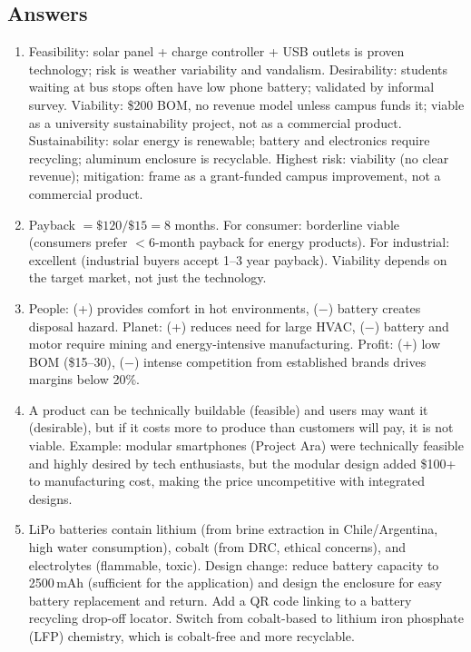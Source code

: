 \documentclass[11pt,letterpaper,twoside,openany]{book}
\begin{document}
\subsection{Answers}
\begin{enumerate}[leftmargin=1.5em]
\item Feasibility: solar panel + charge controller + USB outlets is proven technology; risk is weather variability and vandalism. Desirability: students waiting at bus stops often have low phone battery; validated by informal survey. Viability: \$200 BOM, no revenue model unless campus funds it; viable as a university sustainability project, not as a commercial product. Sustainability: solar energy is renewable; battery and electronics require recycling; aluminum enclosure is recyclable. Highest risk: viability (no clear revenue); mitigation: frame as a grant-funded campus improvement, not a commercial product.
\item Payback $= \$120/\$15 = 8$ months. For consumer: borderline viable (consumers prefer $<$6-month payback for energy products). For industrial: excellent (industrial buyers accept 1--3 year payback). Viability depends on the target market, not just the technology.
\item People: (+) provides comfort in hot environments, ($-$) battery creates disposal hazard. Planet: (+) reduces need for large HVAC, ($-$) battery and motor require mining and energy-intensive manufacturing. Profit: (+) low BOM (\$15--30), ($-$) intense competition from established brands drives margins below 20\%.
\item A product can be technically buildable (feasible) and users may want it (desirable), but if it costs more to produce than customers will pay, it is not viable. Example: modular smartphones (Project Ara) were technically feasible and highly desired by tech enthusiasts, but the modular design added \$100+ to manufacturing cost, making the price uncompetitive with integrated designs.
\item LiPo batteries contain lithium (from brine extraction in Chile/Argentina, high water consumption), cobalt (from DRC, ethical concerns), and electrolytes (flammable, toxic). Design change: reduce battery capacity to 2500\,mAh (sufficient for the application) and design the enclosure for easy battery replacement and return. Add a QR code linking to a battery recycling drop-off locator. Switch from cobalt-based to lithium iron phosphate (LFP) chemistry, which is cobalt-free and more recyclable.
\end{enumerate}
\end{document}
